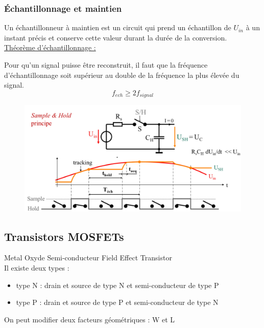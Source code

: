 \documentclass[../main.tex]{subfiles}
\begin{document}
\subsubsection{Échantillonnage et maintien}
Un échantillonneur à maintien est un circuit qui prend un échantillon de $U_{in}$ à un instant précis et conserve cette valeur durant la durée de la conversion.\\




\underline{Théorème d'échantillonnage :}\\
\begin{theorem}
    Pour qu'un signal puisse être reconstruit, il faut que la fréquence d'échantillonnage soit supérieur au double de la fréquence la plus élevée du signal.\begin{equation}
        f_{ech} \geq 2f_{signal}
    \end{equation}
\end{theorem}
\begin{figure}[hbt!]
    \centering
    \includegraphics[width=.5\textwidth]{IMAGES/elec/IMG_0164.jpeg}
\end{figure}

\subsection{Transistors MOSFETs}
Metal Oxyde Semi-conducteur Field Effect Transistor\\

Il existe deux types : \begin{itemize}
    \item type N : drain et source de type N et semi-conducteur de type P\\
    \item type P : drain et source de type P et semi-conducteur de type N\\
\end{itemize}
On peut modifier deux facteurs géométriques : W et L\\
\end{document}

